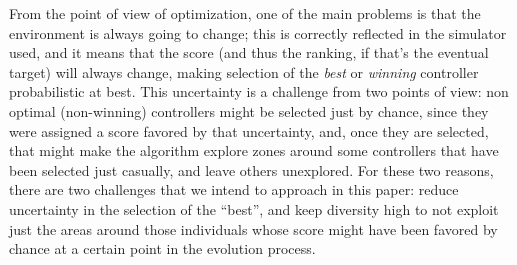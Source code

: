 \documentclass[10pt,journal,compsoc]{IEEEtran}
\begin{document}





From the point of view of optimization, one of the main problems is
that the environment is always going to change; this is correctly
reflected in the simulator used, and it means that the score (and
thus the ranking, if that's the eventual target) will always change,
making selection of the {\em best} or {\em winning} controller
probabilistic at best. This uncertainty is a challenge from two points
of view: non optimal (non-winning) controllers might be selected just
by chance, since they were assigned a score favored by that
uncertainty, and, once they are selected, that might make the
algorithm explore zones around some controllers that have been
selected just casually, and leave others unexplored. For these two
reasons, there are two challenges that we intend to approach in this
paper: reduce uncertainty in the selection of the ``best'', and keep
diversity high to not exploit just the areas around those individuals
whose score might have been favored by chance at a certain point in
the evolution process.
\end{document}
